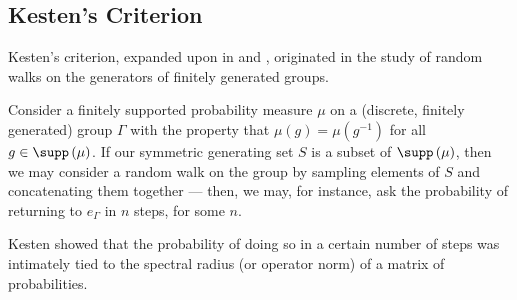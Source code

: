 \subsection{Kesten's Criterion}%
Kesten's criterion, expanded upon in \cite{kesten_random_walks} and \cite{kesten_means}, originated in the study of random walks on the generators of finitely generated groups.\newline

Consider a finitely supported probability measure $\mu$ on a (discrete, finitely generated) group $\Gamma$ with the property that $\mu\left( g \right) = \mu\left( g^{-1} \right)$ for all $g\in \supp\left( \mu \right)$. If our symmetric generating set $S$ is a subset of $\supp\left( \mu \right)$, then we may consider a random walk on the group by sampling elements of $S$ and concatenating them together --- then, we may, for instance, ask the probability of returning to $e_{\Gamma}$ in $n$ steps, for some $n$.\newline

Kesten showed that the probability of doing so in a certain number of steps was intimately tied to the spectral radius (or operator norm) of a matrix of probabilities.\newline

